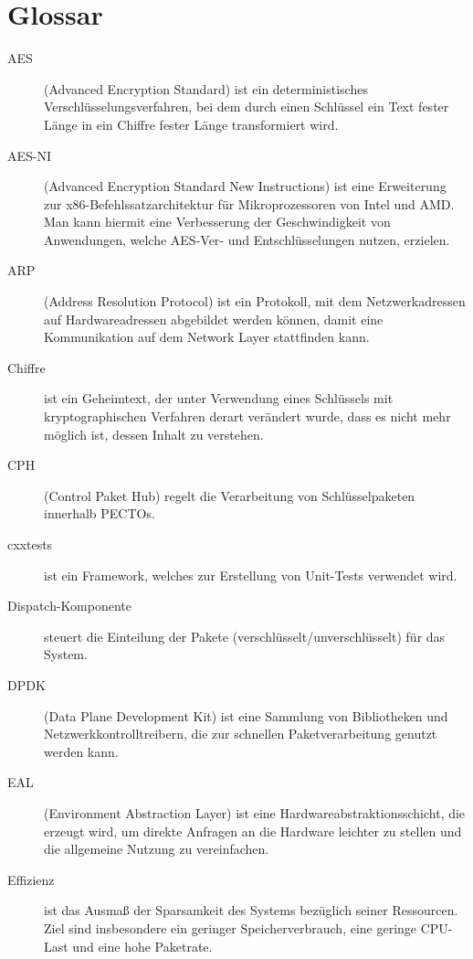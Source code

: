 \section{Glossar}

\begin{description}
	\item[AES] (Advanced Encryption Standard) ist ein deterministisches Verschlüsselungsverfahren, bei dem durch einen Schlüssel ein Text fester Länge in ein Chiffre fester Länge transformiert wird. 
	
	\item[AES-NI] (Advanced Encryption Standard New Instructions) ist eine Erweiterung zur x86-Befehlssatzarchitektur für Mikroprozessoren von Intel und AMD. Man kann hiermit eine Verbesserung der Geschwindigkeit von Anwendungen, welche AES-Ver- und Entschlüsselungen nutzen, erzielen. 
	
	\item[ARP] (Address Resolution Protocol) ist ein Protokoll, mit dem Netzwerkadressen auf Hardwareadressen abgebildet werden können, damit eine Kommunikation auf dem Network Layer stattfinden kann.  
	
	\item[Chiffre] ist ein Geheimtext, der unter Verwendung eines Schlüssels mit kryptographischen Verfahren derart verändert wurde, dass es nicht mehr möglich ist, dessen Inhalt zu verstehen.
	
	\item[CPH] (Control Paket Hub) regelt die Verarbeitung von Schlüsselpaketen innerhalb PECTOs.
	
	\item[cxxtests] ist ein Framework, welches zur Erstellung von Unit-Tests verwendet wird.
	
	\item[Dispatch-Komponente] steuert die Einteilung der Pakete (verschlüsselt/unverschlüsselt) für das System.
	
	\item[DPDK] (Data Plane Development Kit) ist eine Sammlung von Bibliotheken und Netzwerkkontrolltreibern, die zur schnellen Paketverarbeitung genutzt werden kann.
	
	\item[EAL] (Environment Abstraction Layer) ist eine Hardwareabstraktionsschicht, die erzeugt wird, um direkte Anfragen an die Hardware leichter zu stellen und die allgemeine Nutzung zu vereinfachen.
		
	\item[Effizienz] ist das Ausmaß der Sparsamkeit des Systems bezüglich seiner Ressourcen. Ziel sind insbesondere ein geringer Speicherverbrauch, eine geringe CPU-Last und eine hohe Paketrate.
	

\end{description}
